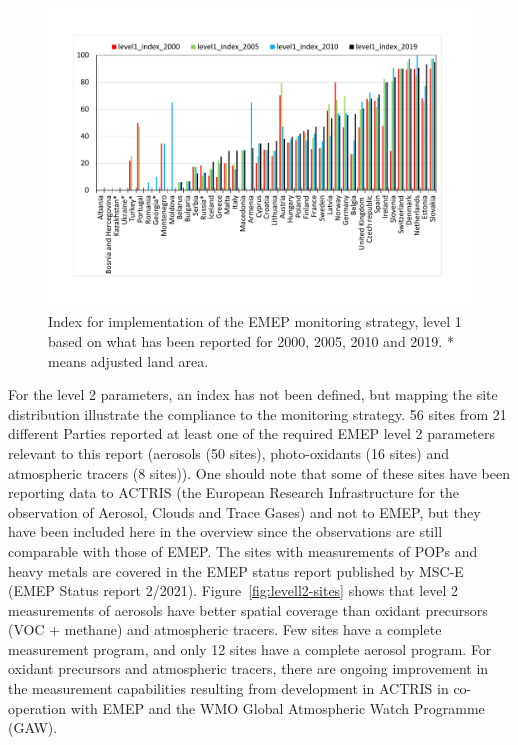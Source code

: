 \begin{figure}
	\centering
	\includegraphics[width=0.74\paperwidth]{FIGS_Obs/index2019.pdf}
	\caption{\label{fig:Index-for-implementation}Index for implementation of the EMEP monitoring strategy, level 1 based on what has been reported for 2000, 2005, 2010 and 2019. {*} means adjusted land area.}
\end{figure}

For the level 2 parameters, an index has not been defined, but mapping the site distribution illustrate the compliance to the monitoring strategy. 56 sites from 21 different Parties reported  at least one of the required  EMEP level 2 parameters relevant to this report (aerosols (50 sites), photo-oxidants (16 sites) and atmospheric tracers (8 sites)). One should note that some of these sites have been reporting data to ACTRIS (the European Research Infrastructure for the observation of Aerosol, Clouds and Trace Gases) and not to EMEP, but they have been included here in the overview since the observations are still comparable with those of EMEP. The sites with measurements of POPs and heavy metals are covered in the EMEP status report published by MSC-E (EMEP Status report 2/2021).  Figure~\ref{fig:levell2-sites} shows that level 2 measurements of aerosols have better spatial coverage than oxidant precursors (VOC + methane) and atmospheric tracers. Few sites have a complete measurement program, and only 12 sites have a complete aerosol program. For oxidant precursors and atmospheric tracers, there are ongoing improvement in the measurement capabilities resulting from development in ACTRIS in co-operation with EMEP and the WMO Global Atmospheric Watch Programme (GAW).

